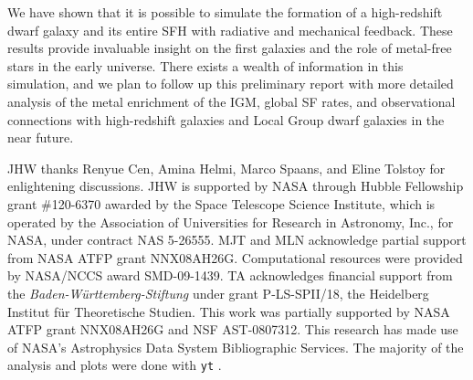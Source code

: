 \documentclass[apjl]{emulateapj}
\begin{document}
We have shown that it is possible to simulate the formation of a
high-redshift dwarf galaxy and its entire SFH with radiative and
mechanical feedback.  These results provide invaluable insight on the
first galaxies and the role of metal-free stars in the early universe.
There exists a wealth of information in this simulation, and we plan
to follow up this preliminary report with more detailed analysis of
the metal enrichment of the IGM, global SF rates, and observational
connections with high-redshift galaxies and Local Group dwarf galaxies
in the near future.

\acknowledgments

JHW thanks Renyue Cen, Amina Helmi, Marco Spaans, and Eline Tolstoy
for enlightening discussions.  JHW is supported by NASA through Hubble
Fellowship grant \#120-6370 awarded by the Space Telescope Science
Institute, which is operated by the Association of Universities for
Research in Astronomy, Inc., for NASA, under contract NAS 5-26555.
MJT and MLN acknowledge partial support from NASA ATFP grant
NNX08AH26G.  Computational resources were provided by NASA/NCCS award
SMD-09-1439.  TA acknowledges financial support from the {\em
  Baden-W\"{u}rttemberg-Stiftung} under grant P-LS-SPII/18, the
Heidelberg Institut f\"ur Theoretische Studien. This work was
partially supported by NASA ATFP grant NNX08AH26G and NSF
AST-0807312. This research has made use of NASA’s Astrophysics Data
System Bibliographic Services.  The majority of the analysis and plots
were done with \texttt{yt} \citep{yt_full_paper}.

%

\end{document}
